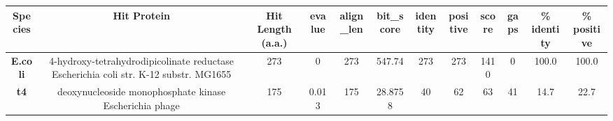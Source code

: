 \begin{tabular}{|c|c|c|c|c|c|c|c|c|c|c|c|} \hline
\textbf{Species} & \textbf{Hit Protein} & \textbf{Hit Length (a.a.)} & \textbf{evalue} & \textbf{align\_len} & \textbf{bit\_score} & \textbf{identity} & \textbf{positive} & \textbf{score} & \textbf{gaps} & \textbf{\% identity} & \textbf{\% positive} \\ \hline
\textbf{E.coli} & 4-hydroxy-tetrahydrodipicolinate reductase Escherichia coli str. K-12 substr. MG1655 & 273 & 0 & 273 & 547.74 & 273 & 273 & 1410 & 0 & 100.0 & 100.0\\
\textbf{t4} & deoxynucleoside monophosphate kinase Escherichia phage  & 175 & 0.013 & 175 & 28.8758 & 40 & 62 & 63 & 41 & 14.7 & 22.7\\
\hline \end{tabular}
